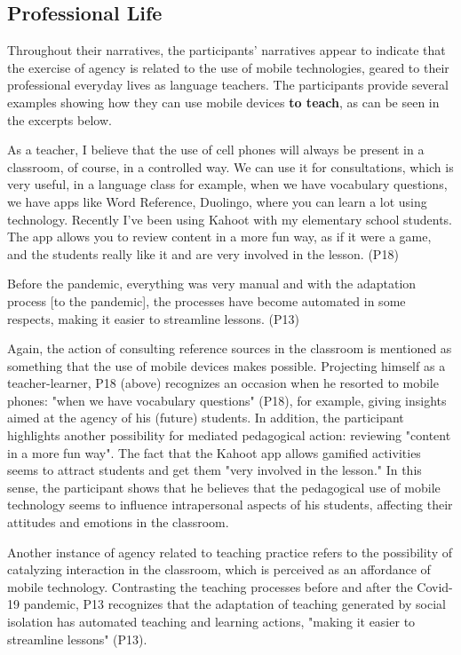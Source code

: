 \subsection{Professional Life}

Throughout their narratives, the
participants' narratives appear to indicate that the exercise of agency
is related to the use of mobile technologies, geared to their
professional everyday lives as language teachers. The participants
provide several examples showing how they can use mobile devices
\textbf{to teach}, as can be seen in the excerpts below.

As a teacher, I believe that the use of cell phones will always be
present in a classroom, of course, in a controlled way. We can use it
for consultations, which is very useful, in a language class for
example, when we have vocabulary questions, we have apps like Word
Reference, Duolingo, where you can learn a lot using technology.
Recently I've been using Kahoot with my elementary
school students. The app allows you to review content in a more fun way,
as if it were a game, and the students really like it and are very
involved in the lesson. (P18)

Before the pandemic, everything was very manual and with the adaptation
process {[}to the pandemic{]}, the processes have become automated in
some respects, making it easier to streamline lessons. (P13)

Again, the action of consulting reference sources in the classroom is
mentioned as something that the use of mobile devices makes possible.
Projecting himself as a teacher-learner, P18 (above) recognizes an
occasion when he resorted to mobile phones: "when we have vocabulary
questions" (P18), for example, giving insights aimed at the agency of
his (future) students. In addition, the participant highlights another
possibility for mediated pedagogical action: reviewing "content in a
more fun way". The fact that the Kahoot app allows gamified activities
seems to attract students and get them "very involved in the lesson." In
this sense, the participant shows that he believes that the pedagogical
use of mobile technology seems to influence intrapersonal aspects of his
students, affecting their attitudes and emotions in the classroom.

Another instance of agency related to teaching practice refers to the
possibility of catalyzing interaction in the classroom, which is
perceived as an affordance of mobile technology. Contrasting the
teaching processes before and after the Covid-19 pandemic, P13
recognizes that the adaptation of teaching generated by social isolation
has automated teaching and learning actions, "making it easier to
streamline lessons" (P13).

